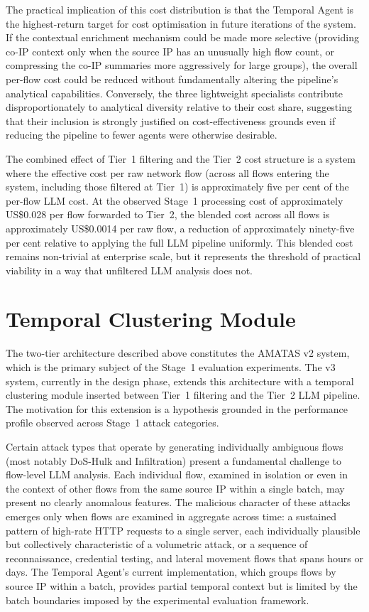 The practical implication of this cost distribution is that the Temporal Agent is the highest-return target for cost optimisation in future iterations of the system. If the contextual enrichment mechanism could be made more selective (providing co-IP context only when the source IP has an unusually high flow count, or compressing the co-IP summaries more aggressively for large groups), the overall per-flow cost could be reduced without fundamentally altering the pipeline's analytical capabilities. Conversely, the three lightweight specialists contribute disproportionately to analytical diversity relative to their cost share, suggesting that their inclusion is strongly justified on cost-effectiveness grounds even if reducing the pipeline to fewer agents were otherwise desirable.

The combined effect of Tier~1 filtering and the Tier~2 cost structure is a system where the effective cost per raw network flow (across all flows entering the system, including those filtered at Tier~1) is approximately five per cent of the per-flow LLM cost. At the observed Stage~1 processing cost of approximately US\$0.028 per flow forwarded to Tier~2, the blended cost across all flows is approximately US\$0.0014 per raw flow, a reduction of approximately ninety-five per cent relative to applying the full LLM pipeline uniformly. This blended cost remains non-trivial at enterprise scale, but it represents the threshold of practical viability in a way that unfiltered LLM analysis does not.

\section{Temporal Clustering Module}
\label{sec:temporal-clustering}

The two-tier architecture described above constitutes the AMATAS v2 system, which is the primary subject of the Stage~1 evaluation experiments. The v3 system, currently in the design phase, extends this architecture with a temporal clustering module inserted between Tier~1 filtering and the Tier~2 LLM pipeline. The motivation for this extension is a hypothesis grounded in the performance profile observed across Stage~1 attack categories.

Certain attack types that operate by generating individually ambiguous flows (most notably DoS-Hulk and Infiltration) present a fundamental challenge to flow-level LLM analysis. Each individual flow, examined in isolation or even in the context of other flows from the same source IP within a single batch, may present no clearly anomalous features. The malicious character of these attacks emerges only when flows are examined in aggregate across time: a sustained pattern of high-rate HTTP requests to a single server, each individually plausible but collectively characteristic of a volumetric attack, or a sequence of reconnaissance, credential testing, and lateral movement flows that spans hours or days. The Temporal Agent's current implementation, which groups flows by source IP within a batch, provides partial temporal context but is limited by the batch boundaries imposed by the experimental evaluation framework.

